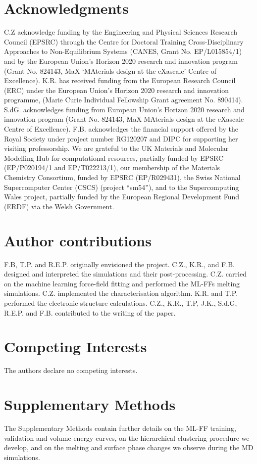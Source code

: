 \documentclass[%
aip,
 amsmath,amssymb,
 reprint,
]{revtex4-1}
\begin{document}
\section*{Acknowledgments}
\label{sec:acknowledgments}
%
C.Z acknowledge funding by the Engineering and Physical Sciences Research Council (EPSRC) through the Centre for Doctoral Training Cross-Disciplinary Approaches to Non-Equilibrium Systems (CANES, Grant No. EP/L015854/1) and by the European Union’s Horizon 2020 research and innovation program (Grant No. 824143, MaX `MAterials design at the eXascale' Centre of Excellence).
%
K.R.  has received funding from the European Research Council (ERC) under the European Union’s Horizon 2020 research and innovation programme, (Marie Curie Individual Fellowship Grant agreement No. 890414).
%
S.dG. acknowledges funding from European Union’s Horizon 2020 research and innovation program (Grant No. 824143, MaX MAterials design at the eXascale Centre of Excellence). 
%
F.B. acknowledges the financial support offered by the Royal Society under project number RG120207 and DIPC for supporting her visiting professorship.
%
We are grateful to the UK Materials and Molecular Modelling Hub for computational resources, partially funded by EPSRC (EP/P020194/1 and EP/T022213/1), our membership of the Materials Chemistry Consortium, funded by EPSRC (EP/R029431), the Swiss National Supercomputer Center (CSCS) 
(project “sm54”), and to the Supercomputing Wales project, partially funded by the European Regional Development Fund (ERDF) via the Welsh Government. 
%
\section*{Author contributions}
\label{sec:author_contributions}
F.B, T.P. and R.E.P. originally envisioned the project. 
%
C.Z., K.R., and F.B. designed and interpreted the simulations and their post-processing.
%
C.Z. carried on the machine learning force-field fitting and performed the ML-FFs melting simulations. 
%
C.Z. implemented the characterisation algorithm.
%
K.R. and T.P. performed the electronic structure calculations.
%
C.Z., K.R., T.P, J.K., S.d.G, R.E.P. and F.B. contributed to the writing of the paper.
%
\section*{Competing Interests}
\label{sec:competing_interests}
%
The authors declare no competing interests.
%
\section*{Supplementary Methods}
\label{subsec:supplementary_materials}
The Supplementary Methods contain further details on the ML-FF training, validation and volume-energy curves, on the hierarchical clustering procedure we develop, and on the melting and surface phase changes we observe during the MD simulations.
%
\newpage
\clearpage
\end{document}
